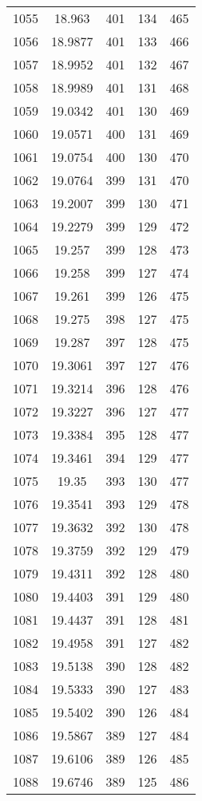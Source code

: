 \documentclass[12pt,a4paper]{article}
\begin{document}
\begin{tabular}{r|cccc}
	1055 & 18.963 & 401 & 134 & 465 \\
	1056 & 18.9877 & 401 & 133 & 466 \\
	1057 & 18.9952 & 401 & 132 & 467 \\
	1058 & 18.9989 & 401 & 131 & 468 \\
	1059 & 19.0342 & 401 & 130 & 469 \\
	1060 & 19.0571 & 400 & 131 & 469 \\
	1061 & 19.0754 & 400 & 130 & 470 \\
	1062 & 19.0764 & 399 & 131 & 470 \\
	1063 & 19.2007 & 399 & 130 & 471 \\
	1064 & 19.2279 & 399 & 129 & 472 \\
	1065 & 19.257 & 399 & 128 & 473 \\
	1066 & 19.258 & 399 & 127 & 474 \\
	1067 & 19.261 & 399 & 126 & 475 \\
	1068 & 19.275 & 398 & 127 & 475 \\
	1069 & 19.287 & 397 & 128 & 475 \\
	1070 & 19.3061 & 397 & 127 & 476 \\
	1071 & 19.3214 & 396 & 128 & 476 \\
	1072 & 19.3227 & 396 & 127 & 477 \\
	1073 & 19.3384 & 395 & 128 & 477 \\
	1074 & 19.3461 & 394 & 129 & 477 \\
	1075 & 19.35 & 393 & 130 & 477 \\
	1076 & 19.3541 & 393 & 129 & 478 \\
	1077 & 19.3632 & 392 & 130 & 478 \\
	1078 & 19.3759 & 392 & 129 & 479 \\
	1079 & 19.4311 & 392 & 128 & 480 \\
	1080 & 19.4403 & 391 & 129 & 480 \\
	1081 & 19.4437 & 391 & 128 & 481 \\
	1082 & 19.4958 & 391 & 127 & 482 \\
	1083 & 19.5138 & 390 & 128 & 482 \\
	1084 & 19.5333 & 390 & 127 & 483 \\
	1085 & 19.5402 & 390 & 126 & 484 \\
	1086 & 19.5867 & 389 & 127 & 484 \\
	1087 & 19.6106 & 389 & 126 & 485 \\
	1088 & 19.6746 & 389 & 125 & 486 \\

\end{tabular}
\end{document}
